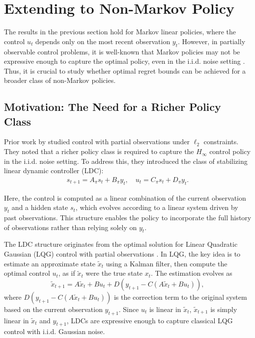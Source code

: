 \section{Extending to Non-Markov Policy}\label{sec:non-markov}

The results in the previous section hold for Markov linear policies, where the control 
$u_t$ depends only on the most recent observation $y_t$. However, in partially observable control problems, it is well-known that Markov policies may not be expressive enough to capture the optimal policy, even in the i.i.d. noise setting \citep{bacsar2008h}. Thus, it is crucial to study whether optimal regret bounds can be achieved for a broader class of non-Markov policies.

\subsection{Motivation: The Need for a Richer Policy Class}
Prior work by \cite{simchowitz2020improper} studied control with partial observations under $\ell_2$ constraints. They noted that a richer policy class is required to capture the $H_{\infty}$ control policy in the i.i.d. noise setting. To address this, they introduced the class of stabilizing linear dynamic controller (LDC):
\begin{align*}
s_{t+1}=A_{\pi}s_t+B_{\pi}y_t, \quad u_t=C_{\pi}s_t+D_{\pi}y_t. 
\end{align*}

Here, the control is computed as a linear combination of the current observation $y_t$ and a hidden state $s_t$, which evolves according to a linear system driven by past observations. This structure enables the policy to incorporate the full history of observations rather than relying solely on 
$y_t$.

The LDC structure originates from the optimal solution for Linear Quadratic Gaussian (LQG) control with partial observations \citep{bacsar2008h}. In LQG, the key idea is to estimate an approximate state $\tilde{x}_t$ using a Kalman filter, then compute the optimal control $u_t$, as if $\tilde{x}_t$ were the true state $x_t$. The estimation evolves as 
$$\tilde{x}_{t+1}=A \tilde{x}_t+Bu_t+D(y_{t+1}-C(A \tilde{x}_t+Bu_t)),$$
where $D(y_{t+1}-C(A \tilde{x}_t+Bu_t))$ is the correction term to the original system based on the current observation $y_{t+1}$. Since $u_t$ is linear in $\tilde{x}_t$, $\tilde{x}_{t+1}$ is simply linear in $\tilde{x}_t$ and $y_{t+1}$, LDCs are expressive enough to capture classical LQG control with i.i.d. Gaussian noise.

